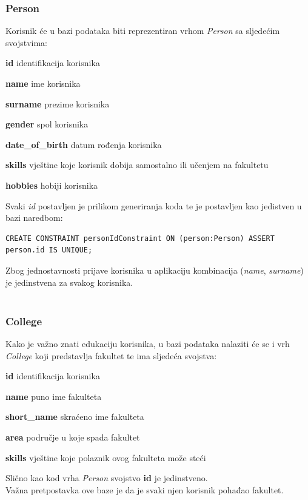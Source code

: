 \documentclass[titlepage, 12pt]{scrartcl}
\begin{document}
\subsubsection{Person}\label{sec:Person}
Korisnik će u bazi podataka biti reprezentiran vrhom \emph{Person} sa sljedećim svojstvima:
\begin{itemize}
\begin{samepage}
    \item \textbf{id} identifikacija korisnika
    \item \textbf{name} ime korisnika
    \item \textbf{surname} prezime korisnika
    \item \textbf{gender} spol korisnika
    \item \textbf{date\_of\_birth} datum rođenja korisnika
    \item \textbf{skills} vještine koje korisnik dobija samostalno ili učenjem na fakultetu
    \item \textbf{hobbies} hobiji korisnika
\end{samepage}
\end{itemize}
Svaki \emph{id} postavljen je prilikom generiranja koda te je postavljen kao jedistven u bazi naredbom:
\begin{samepage}
\begin{verbatim}
CREATE CONSTRAINT personIdConstraint ON (person:Person) ASSERT person.id IS UNIQUE;
\end{verbatim}
\end{samepage}
Zbog jednostavnosti prijave korisnika u aplikaciju kombinacija (\emph{name}, \emph{surname}) je jedinstvena za svakog korisnika.
\\ \\
\subsubsection{College}
Kako je važno znati edukaciju korisnika, u bazi podataka nalaziti će se i vrh \emph{College} koji predstavlja fakultet te ima sljedeća svojstva:
\begin{itemize}
\begin{samepage}
    \item \textbf{id} identifikacija korisnika
    \item \textbf{name} puno ime fakulteta
    \item \textbf{short\_name} skraćeno ime fakulteta
    \item \textbf{area} područje u koje spada fakultet
    \item \textbf{skills} vještine koje polaznik ovog fakulteta može steći
\end{samepage}
\end{itemize}
Slično kao kod vrha \emph{Person} svojstvo \textbf{id} je jedinstveno. \\
Važna pretpostavka ove baze je da je svaki njen korisnik pohađao fakultet. 
\end{document}
